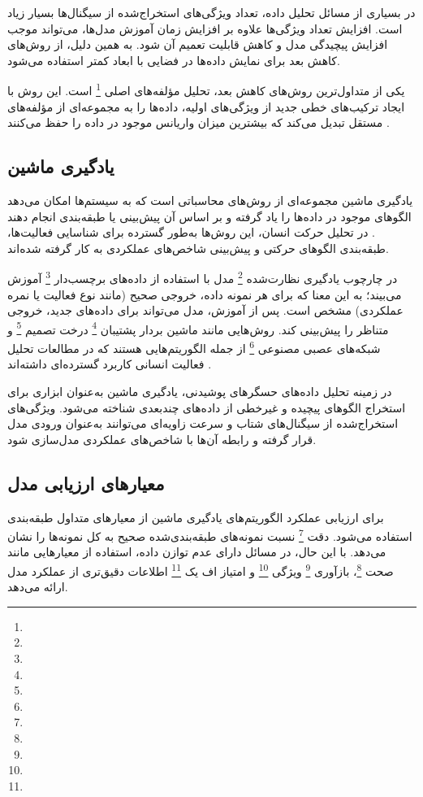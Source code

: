 در بسیاری از مسائل تحلیل داده، تعداد ویژگی‌های استخراج‌شده از سیگنال‌ها بسیار زیاد است. افزایش تعداد ویژگی‌ها علاوه بر افزایش زمان آموزش مدل‌ها، می‌تواند موجب افزایش پیچیدگی مدل و کاهش قابلیت تعمیم آن شود. به همین دلیل، از روش‌های کاهش بعد برای نمایش داده‌ها در فضایی با ابعاد کمتر استفاده می‌شود.

یکی از متداول‌ترین روش‌های کاهش بعد، تحلیل مؤلفه‌های اصلی
\footnote{}
است. این روش با ایجاد ترکیب‌های خطی جدید از ویژگی‌های اولیه، داده‌ها را به مجموعه‌ای از مؤلفه‌های مستقل تبدیل می‌کند که بیشترین میزان واریانس موجود در داده را حفظ می‌کنند
 \cite{Jolliffe2002PCA}.


\subsection{یادگیری ماشین}

یادگیری ماشین مجموعه‌ای از روش‌های محاسباتی است که به سیستم‌ها امکان می‌دهد الگوهای موجود در داده‌ها را یاد گرفته و بر اساس آن پیش‌بینی یا طبقه‌بندی انجام دهند 
 \cite{Bishop2006PatternRecognition}. 
 در تحلیل حرکت انسان، این روش‌ها به‌طور گسترده برای شناسایی فعالیت‌ها، طبقه‌بندی الگوهای حرکتی و پیش‌بینی شاخص‌های عملکردی به کار گرفته شده‌اند.

در چارچوب یادگیری نظارت‌شده
 \footnote{}
  مدل با استفاده از داده‌های برچسب‌دار
 \footnote{}
   آموزش می‌بیند؛ به این معنا که برای هر نمونه داده، خروجی صحیح (مانند نوع فعالیت یا نمره عملکردی) مشخص است. پس از آموزش، مدل می‌تواند برای داده‌های جدید، خروجی متناظر را پیش‌بینی کند. روش‌هایی مانند ماشین بردار پشتیبان
 \footnote{}
    درخت تصمیم
 \footnote{}  
     و شبکه‌های عصبی مصنوعی 
 \footnote{ }
     از جمله الگوریتم‌هایی هستند که در مطالعات تحلیل فعالیت انسانی کاربرد گسترده‌ای داشته‌اند 
 \cite{Lara2013Survey}.

در زمینه تحلیل داده‌های حسگرهای پوشیدنی، یادگیری ماشین به‌عنوان ابزاری برای استخراج الگوهای پیچیده و غیرخطی از داده‌های چندبعدی شناخته می‌شود. ویژگی‌های استخراج‌شده از سیگنال‌های شتاب و سرعت زاویه‌ای می‌توانند به‌عنوان ورودی مدل قرار گرفته و رابطه آن‌ها با شاخص‌های عملکردی مدل‌سازی شود.

\subsection{معیارهای ارزیابی مدل}

برای ارزیابی عملکرد الگوریتم‌های یادگیری ماشین از معیارهای متداول طبقه‌بندی استفاده می‌شود. دقت
\footnote{}
نسبت نمونه‌های طبقه‌بندی‌شده صحیح به کل نمونه‌ها را نشان می‌دهد. با این حال، در مسائل دارای عدم توازن داده، استفاده از معیارهایی مانند صحت
\footnote{}،
بازآوری
\footnote{}
ویژگی
\footnote{}
و امتیاز اف یک
\footnote{}
اطلاعات دقیق‌تری از عملکرد مدل ارائه می‌دهد.

